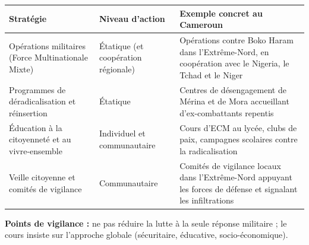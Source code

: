 \documentclass[11pt]{article}
\begin{document}
\begin{corrige}
\begin{center}
\begin{tabularx}{\linewidth}{|X|X|X|}
\hline
\rowcolor{popblueL} \textbf{Stratégie} & \textbf{Niveau d'action} & \textbf{Exemple concret au Cameroun} \\
\hline
Opérations militaires (Force Multinationale Mixte) & Étatique (et coopération régionale) & Opérations contre Boko Haram dans l'Extrême-Nord, en coopération avec le Nigeria, le Tchad et le Niger \\
\hline
Programmes de déradicalisation et réinsertion & Étatique & Centres de désengagement de Mérina et de Mora accueillant d'ex-combattants repentis \\
\hline
Éducation à la citoyenneté et au vivre-ensemble & Individuel et communautaire & Cours d'ECM au lycée, clubs de paix, campagnes scolaires contre la radicalisation \\
\hline
Veille citoyenne et comités de vigilance & Communautaire & Comités de vigilance locaux dans l'Extrême-Nord appuyant les forces de défense et signalant les infiltrations \\
\hline
\end{tabularx}
\end{center}
\textbf{Points de vigilance :} ne pas réduire la lutte à la seule réponse militaire ; le cours insiste sur l'approche globale (sécuritaire, éducative, socio-économique).
\end{corrige}
\end{document}
